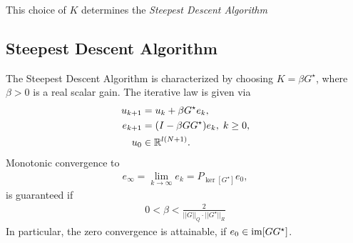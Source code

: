 This choice of $K$ determines the \textit{Steepest Descent Algorithm}

\subsection{Steepest Descent Algorithm}
\begin{alg}
	\label{alg: SDA}
	The Steepest Descent Algorithm is characterized by choosing $K = \beta G^\star$, where $\beta>0$ is a real scalar gain. The iterative law is given via 
	\begin{align}
	\label{eq:errSDA}
	\begin{split}
	u_{k+1} &= u_k + \beta G^\star e_k,\\
	e_{k+1} &= (I- \beta G G^\star) e_{k}, \; k\geq 0,\\
	u_0 &\in {\mathbb{R}}^{l (N+1)}. 
	\end{split}
	\end{align}
	Monotonic convergence to 
	\begin{align}
	\label{eq:SDAErrLim} 
	e_\infty  = \lim_{k\to\infty} e_k = P_{\ker[G^\star]}e_0,
	\end{align} 
	is guaranteed if
	\begin{align*}
	0 <\beta < \frac{2}{||G||_Q\cdot||G^\star||_R}
	\end{align*}
	In particular, the zero convergence is attainable, if $e_0 \in \operatorname{im} [G G^\star]$. 
\end{alg} 
